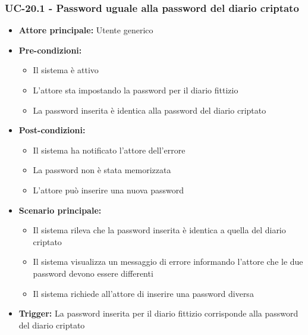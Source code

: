\documentclass[a4paper,12pt]{article}
\begin{document}
\subsubsection{UC-20.1 - Password uguale alla password del diario criptato} \label{subsec:UC-20.1}
\begin{itemize}
    \item \textbf{Attore principale:} Utente generico
    \item \textbf{Pre-condizioni:}
    \begin{itemize}
        \item Il sistema è attivo
        \item L'attore sta impostando la password per il diario fittizio
        \item La password inserita è identica alla password del diario criptato
    \end{itemize}
    \item \textbf{Post-condizioni:} 
    \begin{itemize}
        \item Il sistema ha notificato l'attore dell'errore
        \item La password non è stata memorizzata
        \item L'attore può inserire una nuova password
    \end{itemize}
    \item \textbf{Scenario principale:} 
    \begin{itemize}
        \item Il sistema rileva che la password inserita è identica a quella del diario criptato
        \item Il sistema visualizza un messaggio di errore informando l'attore che le due password devono essere differenti
        \item Il sistema richiede all'attore di inserire una password diversa
    \end{itemize}
    \item \textbf{Trigger:} La password inserita per il diario fittizio corrisponde alla password del diario criptato
\end{itemize}
\end{document}
